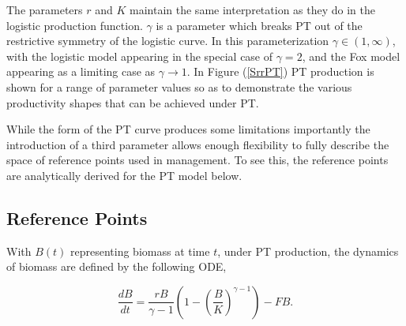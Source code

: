 
%
The parameters $r$ and $K$ maintain the same interpretation as 
they do in the logistic production function. 
%
$\gamma$ is a parameter which breaks PT out of the restrictive symmetry of the
logistic curve. In this parameterization $\gamma\in(1, \infty)$, with the logistic model
appearing in the special case of $\gamma=2$, and the Fox model appearing as
a limiting case as $\gamma\to1$.
%
%
In Figure (\ref{SrrPT}) PT production is shown for a range of parameter values
so as to demonstrate the various productivity shapes that can be achieved under
PT.

%
While the form of the PT curve produces some limitations \cite{punt_extending_2019, fletcher_restructuring_1978} %
importantly the %
introduction of a third parameter allows enough flexibility to fully describe
the space of reference points used in management. To see this, the reference
points are analytically derived for the PT model below. %

%
\subsection{Reference Points}\label{ptRef}
%
With $B(t)$ representing biomass at time $t$, under PT production, the
dynamics of biomass are defined by the following ODE,

\begin{equation}
\frac{dB}{dt} = \frac{r B}{\gamma-1} \left(1-\left(\frac{B}{K}\right)^{\gamma-1}\right) - FB. \label{dBdtPT}
\end{equation}

